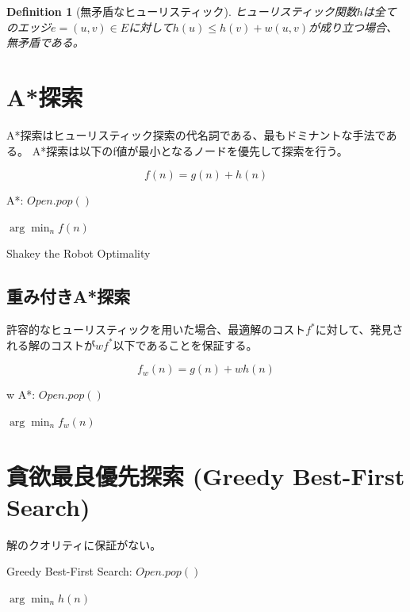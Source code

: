 \documentclass{report}
\newtheorem{definition}{Definition}
\begin{document}
\begin{definition}[無矛盾なヒューリスティック]
ヒューリスティック関数$h$は全てのエッジ$e = (u, v) \in E$に対して$h(u) \leq h(v) + w(u,v)$が成り立つ場合、無矛盾である。
\end{definition}


\section{A*探索}
\label{sec:astar-search}

A*探索はヒューリスティック探索の代名詞である、最もドミナントな手法である。
A*探索は以下のf値が最小となるノードを優先して探索を行う。

\begin{equation}
	f(n) = g(n) + h(n)
\end{equation}

\begin{algorithm}
\caption{A*: $Open.pop()$}
\label{alg:astar-open}
	\Return $\arg \min_n f(n)$
\end{algorithm}

Shakey the Robot
Optimality





\subsection{重み付きA*探索}
\label{sec:weighted-astar-search}

許容的なヒューリスティックを用いた場合、最適解のコスト$f^*$に対して、発見される解のコストが$w f^*$以下であることを保証する。

\begin{equation}
	f_w(n) = g(n) + w h(n)
\end{equation}

\begin{algorithm}
\caption{w A*: $Open.pop()$}
\label{alg:wastar-open}
	\Return $\arg \min_n f_w(n)$
\end{algorithm}

\section{貪欲最良優先探索 (Greedy Best-First Search)}
\label{sec:greedy-best-first-search}

解のクオリティに保証がない。

\begin{algorithm}
\caption{Greedy Best-First Search: $Open.pop()$}
\label{alg:gfs-open}
	\Return $\arg \min_n h(n)$
\end{algorithm}
\end{document}
